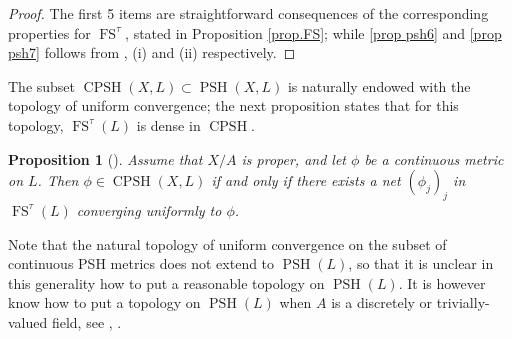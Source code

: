 \documentclass[JEP,XML,SOM,Unicode,published]{cedram}
\newtheorem{prop}[equation]{Proposition}
\theoremstyle{definition}
\DeclareMathOperator{\CPSH}{CPSH}
\DeclareMathOperator{\FS}{FS}
\DeclareMathOperator{\PSH}{PSH}
\begin{document}
\begin{proof} The first 5 items are straightforward consequences of the corresponding properties for $\FS^{\tau}$, stated in Proposition \ref{prop.FS}; while \eqref{prop psh6} and \eqref{prop psh7} follows from \cite[Lem.\,4.6]{BJtriv}, (i) and (ii) respectively.
\end{proof}
The subset $\CPSH(X,L) \subset \PSH(X,L)$ is naturally endowed with the topology of uniform convergence; the next proposition states that for this topology, $\FS^{\tau}(L)$ is dense in $\CPSH$.
\begin{prop}[{\cite[Prop.\,5.20]{BJtriv}}]
Assume that $X/A$ is proper, and let $\phi$ be a continuous metric on $L$. Then $\phi \in \CPSH(X,L)$ if and only if there exists a net $(\phi_j)_{j}$ in $\FS^{\tau}(L)$ converging uniformly to $\phi$.
\end{prop}
Note that the natural topology of uniform convergence on the subset of continuous PSH metrics does not extend to $\PSH(L)$, so that it is unclear in this generality how to put a reasonable topology on $\PSH(L)$. It is however know how to put a topology on $\PSH(L)$ when $A$ is a discretely or trivially-valued field, see \cite{BFJ2}, \cite{BJv4}.
\end{document}
